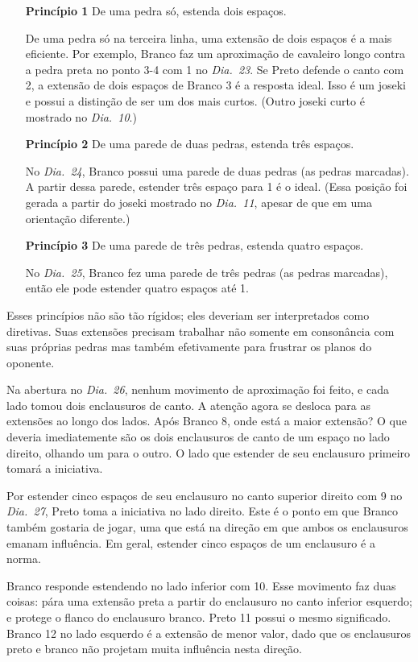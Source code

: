 \begin{itemize}
    \item[\textbf{Princípio 1}] De uma pedra só, estenda dois espaços.
        
        De uma pedra só na terceira linha, uma extensão de dois espaços é a mais eficiente. Por exemplo, Branco faz um aproximação de cavaleiro longo contra a pedra preta no ponto 3-4 com 1 no \emph{Dia.\@~23}. Se Preto defende o canto com 2, a extensão de dois espaços de Branco 3 é a resposta ideal. Isso é um joseki e possui a distinção de ser um dos mais curtos. (Outro joseki curto é mostrado no \emph{Dia.\@~10}.) 
    \item[\textbf{Princípio 2}] De uma parede de duas pedras, estenda três espaços.
    
        No \emph{Dia.\@~24}, Branco possui uma parede de duas pedras (as pedras marcadas). A partir dessa parede, estender três espaço para 1 é o ideal. (Essa posição foi gerada a partir do joseki mostrado no \emph{Dia.\@~11}, apesar de que em uma orientação diferente.)
    \item[\textbf{Princípio 3}] De uma parede de três pedras, estenda quatro espaços. 

        No \emph{Dia.\@~25}, Branco fez uma parede de três pedras (as pedras marcadas), então ele pode estender quatro espaços até 1.
\end{itemize}

Esses princípios não são tão rígidos; eles deveriam ser interpretados como diretivas. Suas extensões precisam trabalhar não somente em consonância com suas próprias pedras mas também efetivamente para frustrar os planos do oponente.

Na abertura no \emph{Dia.\@~26}, nenhum movimento de aproximação foi feito, e cada lado tomou dois enclausuros de canto. A atenção agora se desloca para as extensões ao longo dos lados. Após Branco 8, onde está a maior extensão? O que deveria imediatemente são os dois enclausuros de canto de um espaço no lado direito, olhando um para o outro. O lado que estender de seu enclausuro primeiro tomará a iniciativa.

Por estender cinco espaços de seu enclausuro no canto superior direito com 9 no \emph{Dia.\@~27}, Preto toma a iniciativa no lado direito. Este é o ponto em que Branco também gostaria de jogar, uma que está na direção em que ambos os enclausuros emanam influência. Em geral, estender cinco espaços de um enclausuro é a norma.

Branco responde estendendo no lado inferior com 10. Esse movimento faz duas coisas: pára uma extensão preta a partir do enclausuro no canto inferior esquerdo; e protege o flanco do enclausuro branco. Preto 11 possui o mesmo significado. Branco 12 no lado esquerdo é a extensão de menor valor, dado que os enclausuros preto e branco não projetam muita influência nesta direção.

